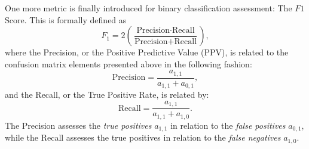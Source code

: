             One more metric is finally introduced for binary classification assessment: The $F1$ Score. This is formally defined as
            \begin{equation}
                F_1 = 2\left(\frac{\text{Precision}\cdot \text{Recall}}{\text{Precision} + \text{Recall}}\right),
            \end{equation}
            where the Precision, or the Positive Predictive Value (PPV), is related to the confusion matrix elements presented above in the following fashion:
            \begin{equation}
                \text{Precision} = \frac{a_{1,1}}{a_{1,1}+a_{0,1}},
            \end{equation}
            and the Recall, or the True Positive Rate, is related by:
            \begin{equation}
                \text{Recall} = \frac{a_{1,1}}{a_{1,1}+a_{1,0}}.
            \end{equation}
            The Precision assesses the \textit{true positives} $a_{1,1}$ in relation to the \textit{false positives} $a_{0,1}$, while the Recall assesses the true positives in relation to the \textit{false negatives} $a_{1,0}$\cite{2}.
            
